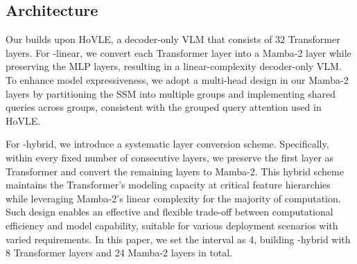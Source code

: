 \subsection{Architecture}
\label{sec:arch}
Our \name{} builds upon HoVLE, a decoder-only VLM that consists of 32 Transformer layers. 
For \name{}-linear, we convert each Transformer layer into a Mamba-2 layer while preserving the MLP layers, resulting in a linear-complexity decoder-only VLM. To enhance model expressiveness, we adopt a multi-head design in our Mamba-2 layers by partitioning the SSM into multiple groups and implementing shared queries across groups, consistent with the grouped query attention used in HoVLE.

For \name{}-hybrid, we introduce a systematic layer conversion scheme. Specifically, within every fixed number of consecutive layers, we preserve the first layer as Transformer and convert the remaining layers to Mamba-2. This hybrid scheme maintains the Transformer's modeling capacity at critical feature hierarchies while leveraging Mamba-2's linear complexity for the majority of computation. Such design enables an effective and flexible trade-off between computational efficiency and model capability, suitable for various deployment scenarios with varied requirements. In this paper, we set the interval as 4, building \name{}-hybrid with 8 Transformer layers and 24 Mamba-2 layers in total.
